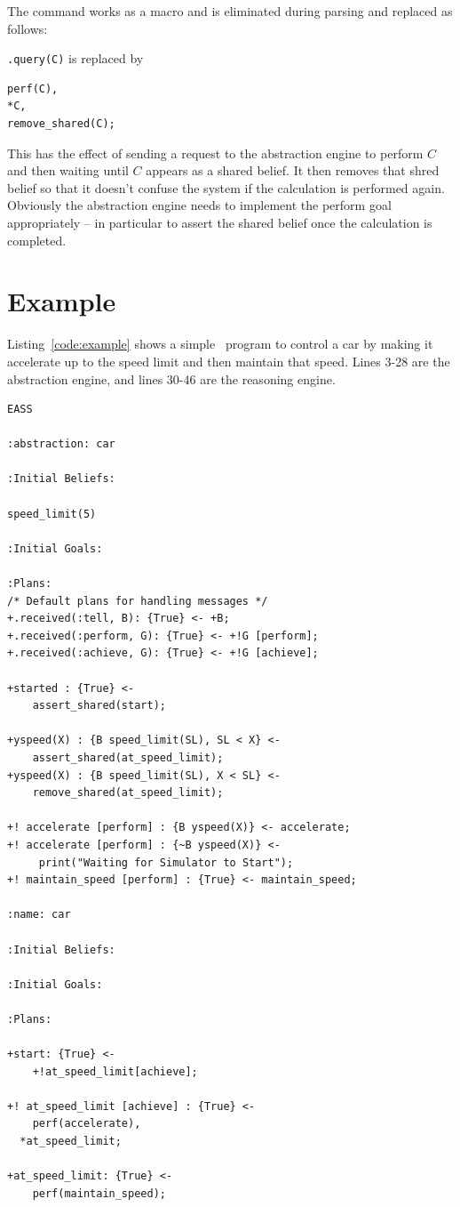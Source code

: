 \documentclass[a4]{article}
\begin{document}
The command works as a macro and is eliminated during parsing and replaced as follows:

\texttt{.query(C)} is replaced by
\begin{verbatim}
perf(C),
*C,
remove_shared(C);
\end{verbatim}
This has the effect of sending a request to the abstraction engine to perform $C$ and then waiting until $C$ appears as a shared belief.  It then removes that shred belief so that it doesn't confuse the system if the calculation is performed again.  Obviously the abstraction engine needs to implement the perform goal appropriately -- in particular to assert the shared belief once the calculation is completed.

\section{Example}
Listing~\ref{code:example} shows a simple \eass\ program to control a car by making it accelerate up to the speed limit and then maintain that speed.  Lines 3-28 are the abstraction engine, and lines 30-46 are the reasoning engine.

\begin{lstlisting}[float,caption=A Simple EASS Program,basicstyle=\sffamily,style=easslisting,language=Gwendolen,label=code:example]
EASS

:abstraction: car

:Initial Beliefs:

speed_limit(5)
											
:Initial Goals:
		
:Plans: 
/* Default plans for handling messages */
+.received(:tell, B): {True} <- +B;   
+.received(:perform, G): {True} <- +!G [perform];
+.received(:achieve, G): {True} <- +!G [achieve];

+started : {True} <-
	assert_shared(start);

+yspeed(X) : {B speed_limit(SL), SL < X} <-
	assert_shared(at_speed_limit);
+yspeed(X) : {B speed_limit(SL), X < SL} <-
	remove_shared(at_speed_limit);
	
+! accelerate [perform] : {B yspeed(X)} <- accelerate;
+! accelerate [perform] : {~B yspeed(X)} <- 
     print("Waiting for Simulator to Start");
+! maintain_speed [perform] : {True} <- maintain_speed;

:name: car
			
:Initial Beliefs:
													
:Initial Goals:
		
:Plans: 

+start: {True} <-
	+!at_speed_limit[achieve];

+! at_speed_limit [achieve] : {True} <-
	perf(accelerate),
  *at_speed_limit;

+at_speed_limit: {True} <-
	perf(maintain_speed);
\end{lstlisting}
\end{document}
